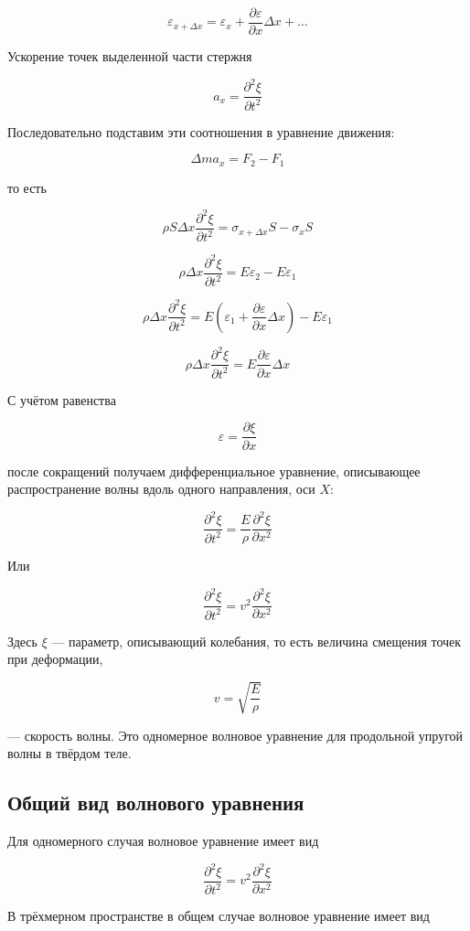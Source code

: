 \documentclass[a4paper,12pt]{article}
\begin{document}
\[
\varepsilon_{x+\Delta x} = \varepsilon_x + \frac{\partial \varepsilon}{\partial x}\Delta x + \ldots
\]

Ускорение точек выделенной части стержня

\[
a_x = \frac{\partial^2 \xi}{\partial t^2}
\]

Последовательно подставим эти соотношения в уравнение движения:

\[
\Delta m a_x = F_2 - F_1
\]

то есть

\[
\rho S \Delta x \frac{\partial^2 \xi}{\partial t^2} = \sigma_{x+\Delta x} S - \sigma_x S
\]

\[
\rho \Delta x \frac{\partial^2 \xi}{\partial t^2} = E \varepsilon_2 - E \varepsilon_1
\]

\[
\rho \Delta x \frac{\partial^2 \xi}{\partial t^2} = E \left( \varepsilon_1 + \frac{\partial \varepsilon}{\partial x}\Delta x \right) - E \varepsilon_1
\]

\[
\rho \Delta x \frac{\partial^2 \xi}{\partial t^2} = E \frac{\partial \varepsilon}{\partial x}\Delta x
\]

С учётом равенства

\[
\varepsilon = \frac{\partial \xi}{\partial x}
\]

после сокращений получаем дифференциальное уравнение, описывающее распространение волны вдоль одного направления, оси \(X\):

\[
\frac{\partial^2 \xi}{\partial t^2} = \frac{E}{\rho}\frac{\partial^2 \xi}{\partial x^2}
\]

Или

\[
\frac{\partial^2 \xi}{\partial t^2} = v^2 \frac{\partial^2 \xi}{\partial x^2}
\]

Здесь \(\xi\) — параметр, описывающий колебания, то есть величина смещения точек при деформации,

\[
v = \sqrt{\frac{E}{\rho}}
\]

— скорость волны. Это одномерное волновое уравнение для продольной упругой волны в твёрдом теле.

\subsection*{Общий вид волнового уравнения}

Для одномерного случая волновое уравнение имеет вид

\[
\frac{\partial^2 \xi}{\partial t^2} = v^2 \frac{\partial^2 \xi}{\partial x^2}
\]

В трёхмерном пространстве в общем случае волновое уравнение имеет вид
\end{document}
